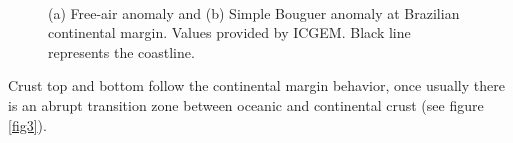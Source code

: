 \documentclass{sciposter}
\begin{document}
\begin{multicols}{3}
	\begin{figure}[ht!]
	\begin{center}
	\\
	\end{center}
	\caption{(a) Free-air anomaly and (b) Simple Bouguer anomaly at Brazilian continental margin. Values provided by ICGEM. Black line represents the coastline.}
	\label{fig2}
	\end{figure}
	
	Crust top and bottom follow the continental margin behavior, once usually there is an abrupt transition zone between oceanic and continental crust (see figure \ref{fig3}).
	

\end{multicols}
\end{document}
